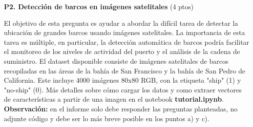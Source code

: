 \documentclass[11pt,letterpaper]{article}
\begin{document}
\noindent\textbf{P2. Detección de barcos en imágenes satelitales} (4 ptos)
\vspace{5mm}

 El objetivo de esta pregunta es ayudar a abordar la difícil tarea de detectar la ubicación de grandes barcos usando imágenes satelitales. La importancia de esta tarea es múltiple, en particular, la detección automática de barcos podría facilitar el monitoreo de los niveles de actividad del puerto y el análisis de la cadena de suministro. El dataset disponible consiste de imágenes satelitales de barcos recopiladas en las áreas de la bahía de San Francisco y la bahía de San Pedro de California.  Este incluye 4000 imágenes 80x80 RGB, con la etiqueta "ship" (1) y "no-ship" (0). Más detalles sobre cómo cargar los datos y como extraer vectores de características a partir de una imagen en el notebook \textbf{tutorial.ipynb}. \textbf{Observación:} en el informe solo debe responder las preguntas planteadas, no adjunte código y debe ser lo más breve posible en los puntos a) y c).
\end{document}
